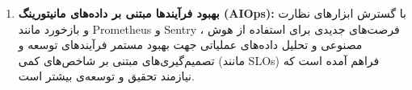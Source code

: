 \begin{enumerate}
  \item \textbf{بهبود فرآیندها مبتنی بر داده‌های مانیتورینگ (AIOps):} با گسترش ابزارهای نظارت و بازخورد مانند Prometheus و Sentry ، فرصت‌های جدیدی برای استفاده از هوش مصنوعی و تحلیل داده‌های عملیاتی جهت بهبود مستمر فرآیندهای توسعه و تصمیم‌گیری‌های مبتنی بر شاخص‌های کمی (مانند SLOs) فراهم آمده است که نیازمند تحقیق و توسعه‌ی بیشتر است.
\end{enumerate}
